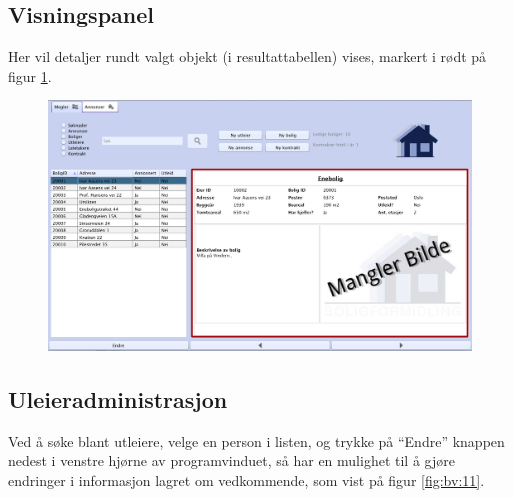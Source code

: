 \newpage
\subsection{Visningspanel}

Her vil detaljer rundt valgt objekt (i resultattabellen) vises, markert i rødt på figur \ref{fig:bv:10}.


\begin{figure}[h!]
 \includegraphics[width=\textwidth,height=\textheight,keepaspectratio]{./img/brukerveiledning/10.png}
 \caption{}
 \label{fig:bv:10}
\end{figure}



\newpage
\subsection{Uleieradministrasjon}

Ved å søke blant utleiere, velge en person i listen, og trykke på “Endre” knappen nedest i venstre
hjørne av programvinduet, så har en mulighet til å gjøre endringer i informasjon lagret om
vedkommende, som vist på figur \ref{fig:bv:11}.

